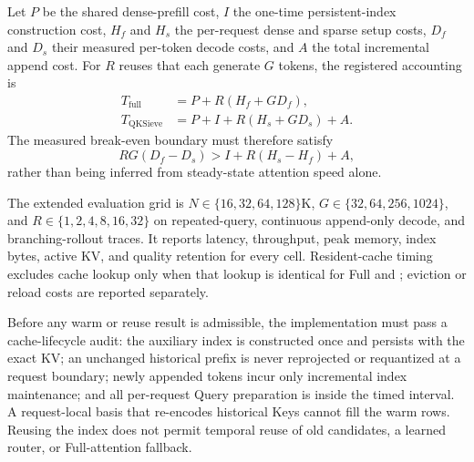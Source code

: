 Let $P$ be the shared dense-prefill cost, $I$ the one-time persistent-index
construction cost, $H_f$ and $H_s$ the per-request dense and sparse setup
costs, $D_f$ and $D_s$ their measured per-token decode costs, and $A$ the
total incremental append cost.  For $R$ reuses that each generate $G$ tokens,
the registered accounting is
\begin{align}
T_{\mathrm{full}} &= P + R(H_f + G D_f), \\
T_{\mathrm{QKSieve}} &= P + I + R(H_s + G D_s) + A.
\end{align}
The measured break-even boundary must therefore satisfy
\begin{equation}
R G(D_f-D_s) > I + R(H_s-H_f) + A,
\label{eq:persistent-break-even}
\end{equation}
rather than being inferred from steady-state attention speed alone.

The extended evaluation grid is $N\in\{16,32,64,128\}$K,
$G\in\{32,64,256,1024\}$, and $R\in\{1,2,4,8,16,32\}$ on repeated-query,
continuous append-only decode, and branching-rollout traces.  It reports latency,
throughput, peak memory, index bytes, active KV, and quality retention for
every cell.  Resident-cache timing excludes cache lookup only when that lookup
is identical for Full and \method; eviction or reload costs are reported
separately.

Before any warm or reuse result is admissible, the implementation must pass a
cache-lifecycle audit: the auxiliary index is constructed once and persists
with the exact KV; an unchanged historical prefix is never reprojected or
requantized at a request boundary; newly appended tokens incur only incremental
index maintenance; and all per-request Query preparation is inside the timed
interval.  A request-local basis that re-encodes historical Keys cannot fill
the warm rows.  Reusing the index does not permit temporal reuse of old
candidates, a learned router, or Full-attention fallback.

